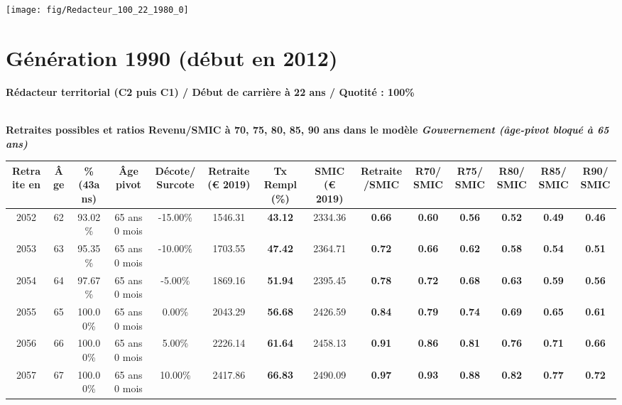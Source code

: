  {\hspace{-2.2cm}\texttt{[image: fig/Redacteur\_100\_22\_1980\_0]}} 

\newpage 
 
\section{Génération 1990 (début en 2012)\label{Redacteur_100_22_1990_0}} 
 
{\bf \noindent Rédacteur territorial (C2 puis C1) / Début de carrière à 22 ans / Quotité : 100\%}  ~ 

 ~\\{\bf \noindent Retraites possibles et ratios Revenu/SMIC à 70, 75, 80, 85, 90 ans dans le modèle \emph{Gouvernement (âge-pivot bloqué à 65 ans)}}  
 
\begin{adjustbox}{max width=\textwidth} 
\begin{tabular}[htb]{|c|c||c|c|c||c|c||c|c||c|c|c|c|c|} 
\hline 
 Retraite en &  Âge &  \%(43ans) &  Âge pivot &  Décote/Surcote &  Retraite (\euro{} 2019) &  Tx Rempl(\%) &  SMIC (\euro{} 2019) &  Retraite/SMIC &  R70/SMIC &  R75/SMIC &  R80/SMIC &  R85/SMIC &  R90/SMIC \\ 
\hline \hline 
 2052 &  62 &  93.02\% &  65 ans 0 mois &  -15.00\% &  1546.31 &  {\bf 43.12} &  2334.36 &  {\bf {\color{red} 0.66}} &  {\bf {\color{red} 0.60}} &  {\bf {\color{red} 0.56}} &  {\bf {\color{red} 0.52}} &  {\bf {\color{red} 0.49}} &  {\bf {\color{red} 0.46}} \\ 
\hline 
 2053 &  63 &  95.35\% &  65 ans 0 mois &  -10.00\% &  1703.55 &  {\bf 47.42} &  2364.71 &  {\bf {\color{red} 0.72}} &  {\bf {\color{red} 0.66}} &  {\bf {\color{red} 0.62}} &  {\bf {\color{red} 0.58}} &  {\bf {\color{red} 0.54}} &  {\bf {\color{red} 0.51}} \\ 
\hline 
 2054 &  64 &  97.67\% &  65 ans 0 mois &  -5.00\% &  1869.16 &  {\bf 51.94} &  2395.45 &  {\bf {\color{red} 0.78}} &  {\bf {\color{red} 0.72}} &  {\bf {\color{red} 0.68}} &  {\bf {\color{red} 0.63}} &  {\bf {\color{red} 0.59}} &  {\bf {\color{red} 0.56}} \\ 
\hline 
 2055 &  65 &  100.00\% &  65 ans 0 mois &  0.00\% &  2043.29 &  {\bf 56.68} &  2426.59 &  {\bf {\color{red} 0.84}} &  {\bf {\color{red} 0.79}} &  {\bf {\color{red} 0.74}} &  {\bf {\color{red} 0.69}} &  {\bf {\color{red} 0.65}} &  {\bf {\color{red} 0.61}} \\ 
\hline 
 2056 &  66 &  100.00\% &  65 ans 0 mois &  5.00\% &  2226.14 &  {\bf 61.64} &  2458.13 &  {\bf {\color{red} 0.91}} &  {\bf {\color{red} 0.86}} &  {\bf {\color{red} 0.81}} &  {\bf {\color{red} 0.76}} &  {\bf {\color{red} 0.71}} &  {\bf {\color{red} 0.66}} \\ 
\hline 
 2057 &  67 &  100.00\% &  65 ans 0 mois &  10.00\% &  2417.86 &  {\bf 66.83} &  2490.09 &  {\bf {\color{red} 0.97}} &  {\bf {\color{red} 0.93}} &  {\bf {\color{red} 0.88}} &  {\bf {\color{red} 0.82}} &  {\bf {\color{red} 0.77}} &  {\bf {\color{red} 0.72}} \\ 
\hline 
\hline 
\end{tabular} 
\end{adjustbox} 
 
